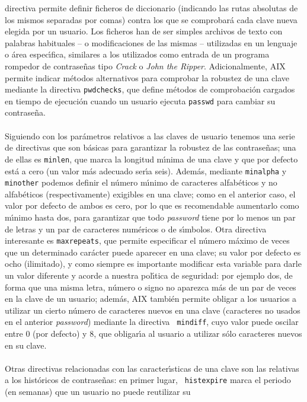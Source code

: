 directiva permite definir ficheros de diccionario (indicando las rutas 
absolutas de los mismos separadas por comas) contra los que se comprobar\'a 
cada clave nueva elegida por un usuario. Los ficheros han de ser simples 
archivos de texto con palabras habituales -- o modificaciones de las mismas -- 
utilizadas en un lenguaje o \'area espec\'{\i}fica, similares a los utilizados 
como entrada de un programa rompedor de contrase\~nas tipo {\it Crack} o {\it 
John the Ripper}. Adicionalmente, AIX permite indicar m\'etodos alternativos
para comprobar la robustez de una clave mediante la directiva {\tt pwdchecks},
que define m\'etodos de comprobaci\'on cargados en tiempo de ejecuci\'on cuando
un usuario ejecuta {\tt passwd} para cambiar su contrase\~na.\\
\\Siguiendo con los par\'ametros relativos a las claves de usuario tenemos una
serie de directivas que son b\'asicas para garantizar la robustez de las
contrase\~nas; una de ellas es {\tt minlen}, que marca la longitud m\'{\i}nima
de una clave y que por defecto est\'a a cero (un valor m\'as adecuado ser\'{\i}a
seis). Adem\'as, mediante {\tt minalpha} y {\tt minother} podemos definir el 
n\'umero
m\'{\i}nimo de caracteres alfab\'eticos y no alfab\'eticos (respectivamente)
exigibles en una clave; como en el anterior caso, el valor por defecto de ambos 
es cero, por lo que es recomendable aumentarlo como m\'{\i}nimo hasta dos, para
garantizar que todo {\it password} tiene por lo menos un par de letras y un par
de caracteres num\'ericos o de s\'{\i}mbolos. Otra directiva interesante es
{\tt maxrepeats}, que permite especificar el n\'umero m\'aximo de veces que un
determinado car\'acter puede aparecer en una clave; su valor por defecto es ocho
(ilimitado), y como siempre es importante modificar esta variable para darle un
valor diferente y acorde a nuestra pol\'{\i}tica de seguridad: por ejemplo dos, 
de forma que una misma letra, n\'umero o signo no aparezca m\'as de un par de 
veces en la clave de un usuario; adem\'as, AIX tambi\'en permite obligar a los
usuarios a utilizar un cierto n\'umero de caracteres nuevos en una clave 
(caracteres no usados en el anterior {\it password}) mediante la directiva {\tt
mindiff}, cuyo valor puede oscilar entre 0 (por defecto) y 8, que obligar\'{\i}a
al usuario a utilizar s\'olo caracteres nuevos en su clave.\\
\\Otras directivas relacionadas con las caracter\'{\i}sticas de una clave son 
las relativas a los hist\'oricos de contrase\~nas: en primer lugar, {\tt
histexpire} marca el periodo (en semanas) que un usuario no puede reutilizar su
